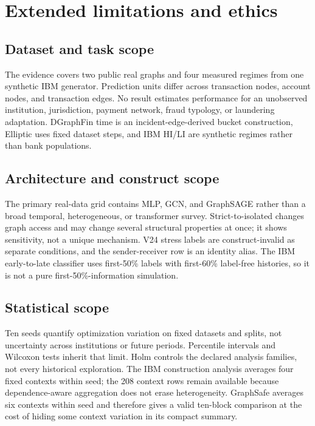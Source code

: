 \section{Extended limitations and ethics}
\label{sec:s-limitations-v2}

\subsection{Dataset and task scope}

The evidence covers two public real graphs and four measured regimes from one synthetic IBM generator. Prediction units differ across transaction nodes, account nodes, and transaction edges. No result estimates performance for an unobserved institution, jurisdiction, payment network, fraud typology, or laundering adaptation. DGraphFin time is an incident-edge-derived bucket construction, Elliptic uses fixed dataset steps, and IBM HI/LI are synthetic regimes rather than bank populations.

\subsection{Architecture and construct scope}

The primary real-data grid contains MLP, GCN, and GraphSAGE rather than a broad temporal, heterogeneous, or transformer survey. Strict-to-isolated changes graph access and may change several structural properties at once; it shows sensitivity, not a unique mechanism. V24 stress labels are construct-invalid as separate conditions, and the sender-receiver row is an identity alias. The IBM early-to-late classifier uses first-50\% labels with first-60\% label-free histories, so it is not a pure first-50\%-information simulation.

\subsection{Statistical scope}

Ten seeds quantify optimization variation on fixed datasets and splits, not uncertainty across institutions or future periods. Percentile intervals and Wilcoxon tests inherit that limit. Holm controls the declared analysis families, not every historical exploration. The IBM construction analysis averages four fixed contexts within seed; the 208 context rows remain available because dependence-aware aggregation does not erase heterogeneity. GraphSafe averages six contexts within seed and therefore gives a valid ten-block comparison at the cost of hiding some context variation in its compact summary.

